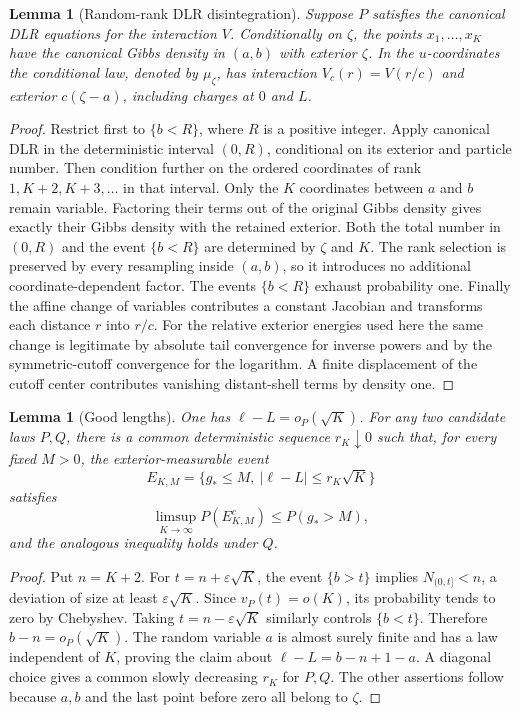 \documentclass[11pt,reqno]{amsart}
\numberwithin{equation}{section}
\newtheorem{lemma}[theorem]{Lemma}
\theoremstyle{definition}
\newcommand{\1}{\mathbf 1}
\begin{document}
\begin{lemma}[Random-rank DLR disintegration]\label{pre:random-dlr}
Suppose $P$ satisfies the canonical DLR equations for the interaction
$V$. Conditionally on $\zeta$, the points $x_1,\ldots,x_K$ have the
canonical Gibbs density in $(a,b)$ with exterior $\zeta$. In the
$u$-coordinates the conditional law, denoted by $\mu_\zeta$, has
interaction $V_c(r)=V(r/c)$ and exterior $c(\zeta-a)$, including
charges at $0$ and $L$.
\end{lemma}

\begin{proof}
Restrict first to $\{b<R\}$, where $R$ is a positive integer. Apply
canonical DLR in the deterministic interval $(0,R)$, conditional on
its exterior and particle number. Then condition further on the
ordered coordinates of rank $1,K+2,K+3,\ldots$ in that interval.
Only the $K$ coordinates between $a$ and $b$ remain variable.
Factoring their terms out of the original Gibbs density gives exactly
their Gibbs density with the retained exterior. Both the total number
in $(0,R)$ and the event $\{b<R\}$ are determined by $\zeta$ and $K$.
The rank selection is preserved by every resampling inside $(a,b)$,
so it introduces no additional coordinate-dependent factor.
The events $\{b<R\}$ exhaust probability one. Finally the affine
change of variables contributes a constant Jacobian and transforms
each distance $r$ into $r/c$. For the relative exterior energies used
here the same change is legitimate by absolute tail convergence for
inverse powers and by the symmetric-cutoff convergence for the
logarithm. A finite displacement of the cutoff center contributes
vanishing distant-shell terms by density one.
\end{proof}

\begin{lemma}[Good lengths]\label{pre:good-length}
One has $\ell-L=o_P(\sqrt K)$. For any two candidate laws $P,Q$,
there is a common deterministic sequence $r_K\downarrow0$ such that,
for every fixed $M>0$, the exterior-measurable event
\begin{equation}\label{pre:good-event}
E_{K,M}=\{g_*\le M,\ |\ell-L|\le r_K\sqrt K\}
\end{equation}
satisfies
\[
\limsup_{K\to\infty}P(E_{K,M}^c)\le P(g_*>M),
\]
and the analogous inequality holds under $Q$.
\end{lemma}

\begin{proof}
Put $n=K+2$. For $t=n+\varepsilon\sqrt K$, the event $\{b>t\}$
implies $N_{(0,t]}<n$, a deviation of size at least
$\varepsilon\sqrt K$. Since $v_P(t)=o(K)$, its probability tends to
zero by Chebyshev. Taking $t=n-\varepsilon\sqrt K$ similarly controls
$\{b<t\}$. Therefore $b-n=o_P(\sqrt K)$. The random variable $a$
is almost surely finite and has a law independent of $K$, proving the
claim about $\ell-L=b-n+1-a$. A diagonal choice gives a common slowly
decreasing $r_K$ for $P,Q$. The other assertions follow because $a,b$
and the last point before zero all belong to $\zeta$.
\end{proof}
\end{document}
